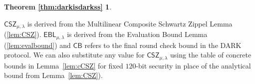 \newtheorem*{darkisdarkss}{Theorem \ref{thm:darkisdarkss}}
\begin{darkisdarkss}
\maintheorem
\end{darkisdarkss}

\begin{remark} $\mathsf{CSZ}_{\mu, \lambda}$ is derived from the Multilinear Composite Schwartz Zippel Lemma (\cref{lem:CSZ}). $\mathsf{EBL}_{\mu, \lambda}$ is derived from the Evaluation Bound Lemma (\cref{lem:evalbound}) and $\mathsf{CB}$ refers to the final round check bound in the DARK protocol. We can also substitute any value for $\mathsf{CSZ}_{\mu,\lambda}$ using the table of concrete bounds in Lemma~\ref{lem:cCSZ} for fixed $120$-bit security in place of the analytical bound from Lemma~\ref{lem:CSZ}).%
\end{remark}



